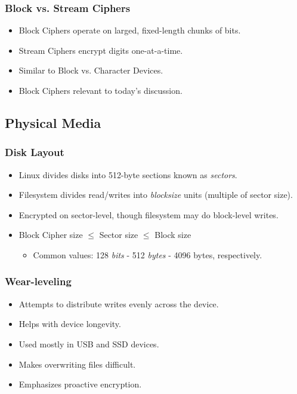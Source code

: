 \documentclass[xcolor={dvipsnames,svgnames},hyperref=dvips]{beamer}
\begin{document}
	\begin{frame}
		\frametitle{Block vs. Stream Ciphers}
		\begin{itemize}
		\item Block Ciphers operate on larged, fixed-length chunks of bits.
		\item Stream Ciphers encrypt digits one-at-a-time.
		\item Similar to Block vs. Character Devices.
		\item Block Ciphers relevant to today's discussion.
		\end{itemize}
	\end{frame}

	\subsection{Physical Media}
	\begin{frame}
		\frametitle{Disk Layout}
		\begin{itemize}
		\item Linux divides disks into 512-byte sections known as \textit{sectors}.
		\item Filesystem divides read/writes into \textit{blocksize} units (multiple of sector size).
		\item Encrypted on sector-level, though filesystem may do block-level writes.
		\item Block Cipher size $\leq$ Sector size $\leq$ Block size
			\begin{itemize}
			\item Common values: 128 \textit{bits} - 512 \textit{bytes} - 4096 bytes, respectively.
			\end{itemize}
		\end{itemize}
	\end{frame}

	\begin{frame}
		\frametitle{Wear-leveling}
		\begin{itemize}
		\item Attempts to distribute writes evenly across the device.
		\item Helps with device longevity.
		\item Used mostly in USB and SSD devices.
		\item Makes overwriting files difficult.
		\item Emphasizes proactive encryption.
		\end{itemize}
	\end{frame}
\end{document}
